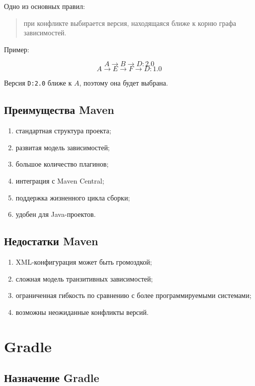 \documentclass[12pt,a4paper]{article}
\begin{document}
Одно из основных правил:
\begin{quote}
при конфликте выбирается версия, находящаяся ближе к корню графа зависимостей.
\end{quote}

Пример:

\[
A \rightarrow B \rightarrow D:2.0
\]
\[
A \rightarrow E \rightarrow F \rightarrow D:1.0
\]

Версия \texttt{D:2.0} ближе к $A$, поэтому она будет выбрана.

\subsection{Преимущества Maven}

\begin{enumerate}
    \item стандартная структура проекта;
    \item развитая модель зависимостей;
    \item большое количество плагинов;
    \item интеграция с Maven Central;
    \item поддержка жизненного цикла сборки;
    \item удобен для Java-проектов.
\end{enumerate}

\subsection{Недостатки Maven}

\begin{enumerate}
    \item XML-конфигурация может быть громоздкой;
    \item сложная модель транзитивных зависимостей;
    \item ограниченная гибкость по сравнению с более программируемыми системами;
    \item возможны неожиданные конфликты версий.
\end{enumerate}

\section{Gradle}

\subsection{Назначение Gradle}
\end{document}
